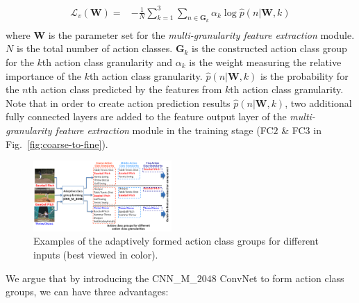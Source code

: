 \documentclass[letterpaper]{article} %
\begin{document}
\begin{equation}
\begin{aligned}
\mathcal{L}_v(\mathbf{W})=&-\frac{1}{N}\sum_{k=1}^{3}\sum_{n\in \mathbf{G}_k}{{\alpha }_{k}\log{\hat{p}(n|\mathbf{W},k)}}\\
\end{aligned}
\label{equation:equ0}
\end{equation}
where $\mathbf{W}$ is the parameter set for the \emph{multi-granularity feature extraction} module. $N$ is the total number of action classes. $\mathbf{G}_k$ is the constructed action class group for the $k$th action class granularity and ${\alpha }_{k}$ is the weight measuring the relative importance of the $k$th action class granularity. $\hat{p}(n|\mathbf{W},k)$ is the probability for the $n$th action class predicted by the features from $k$th action class granularity. Note that in order to create action prediction results $\hat{p}(n|\mathbf{W},k)$, two additional fully connected layers are added to the feature output layer of the \emph{multi-granularity feature extraction} module in the training stage (FC$2$ \& FC$3$ in Fig.~\ref{fig:coarse-to-fine}).


\begin{figure}
  \centering
  \includegraphics[width=0.47\textwidth,height=0.28\textwidth]{./figures1/action_class.png}
  \caption{Examples of the adaptively formed action class groups for different inputs (best viewed in color).}
    \label{fig:action-class}
\end{figure}

We argue that by introducing the CNN\_M\_$2048$ ConvNet to form action class groups, we can have three advantages:
\end{document}
